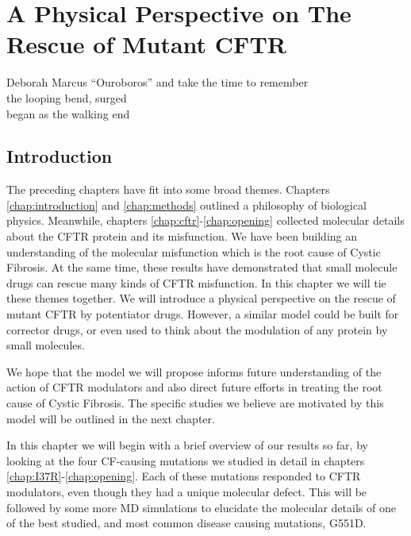 \chapter{A Physical Perspective on The Rescue of Mutant CFTR}
\label{chap:perspective}

\begin{chapquote}{Deborah Marcus ``Ouroboros'' \cite{marcus_ouroboros}}
and take the time to remember\\
the looping bend, surged\\
began as the walking end
\end{chapquote}

\section{Introduction}

The preceding chapters have fit into some broad themes. Chapters \ref{chap:introduction} and \ref{chap:methods} outlined a philosophy of biological physics. Meanwhile, chapters \ref{chap:cftr}-\ref{chap:opening} collected molecular details about the CFTR protein and its misfunction. We have been building an understanding of the molecular misfunction which is the root cause of Cystic Fibrosis. At the same time, these results have demonstrated that small molecule drugs can rescue many kinds of CFTR misfunction. In this chapter we will tie these themes together. We will introduce a physical perspective on the rescue of mutant CFTR by potentiator drugs. However, a similar model could be built for corrector drugs, or even used to think about the modulation of any protein by small molecules.

We hope that the model we will propose informs future understanding of the action of CFTR modulators and also direct future efforts in treating the root cause of Cystic Fibrosis. The specific studies we believe are motivated by this model will be outlined in the next chapter.

In this chapter we will begin with a brief overview of our results so far, by looking at the four CF-causing mutations we studied in detail in chapters \ref{chap:I37R}-\ref{chap:opening}. Each of these mutations responded to CFTR modulators, even though they had a unique molecular defect. This will be followed by some more MD simulations to elucidate the molecular details of one of the best studied, and most common disease causing mutations, G551D.  

